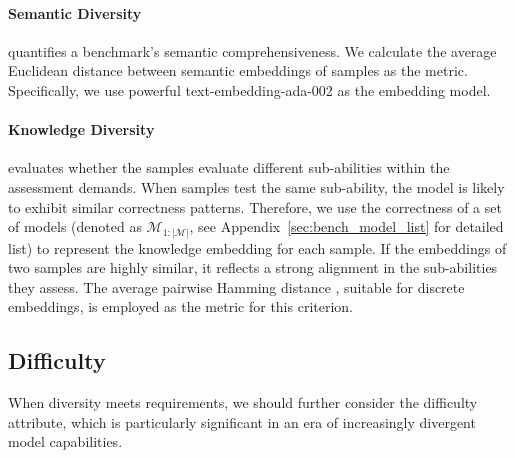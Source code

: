
\paragraph{Semantic Diversity}quantifies a benchmark's semantic comprehensiveness. We calculate the average Euclidean distance between semantic embeddings of samples as the metric. Specifically, we use powerful text-embedding-ada-002 \citep{text-embedding-ada-002} as the embedding model.

\paragraph{Knowledge Diversity}evaluates whether the samples evaluate different sub-abilities within the assessment demands. 
When samples test the same sub-ability, the model is likely to exhibit similar correctness patterns. Therefore, we use the correctness of a set of models (denoted as $\mathcal{M}_{1:|\mathcal{M}|}$, see Appendix~\ref{sec:bench_model_list} for detailed list) to represent the knowledge embedding for each sample. If the embeddings of two samples are highly similar, it reflects a strong alignment in the sub-abilities they assess. The average pairwise Hamming distance \citep{hamming}, suitable for discrete embeddings, is employed as the metric for this criterion.

\subsection{Difficulty}
\label{sec:difficulty}
When diversity meets requirements, we should further consider the difficulty attribute, which is particularly significant in an era of increasingly divergent model capabilities.
